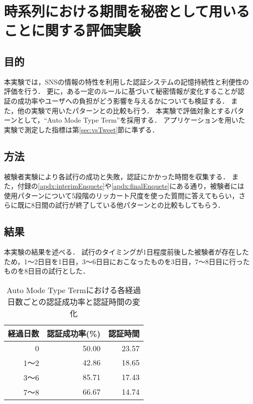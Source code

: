 \section{時系列における期間を秘密として用いることに関する評価実験}\label{sec:vsTerm}
\subsection{目的}
本実験では，SNSの情報の特性を利用した認証システムの記憶持続性と利便性の評価を行う．
更に，ある一定のルールに基づいて秘密情報が変化することが認証の成功率やユーザへの負担がどう影響を与えるかについても検証する．
また，他の実験で用いたパターンとの比較も行う．
本実験で評価対象とするパターンとして，``Auto Mode Type Term''を採用する．
アプリケーションを用いた実験で測定した指標は第\ref{sec:vsTweet}節に準ずる．

\subsection{方法}
被験者実験により各試行の成功と失敗，認証にかかった時間を収集する．
また，付録の\ref{apdx:interimEnquete}や\ref{apdx:finalEnquete}にある通り，被験者には使用パターンについて5段階のリッカート尺度を使った質問に答えてもらい，さらに既に8日間の試行が終了している他パターンとの比較もしてもらう．

\subsection{結果}
本実験の結果を述べる．
試行のタイミングが1日程度前後した被験者が存在したため，1〜2日目を1日目，3〜6日目におこなったものを3日目，7〜8日目に行ったものを8日目の試行とした．
\begin{table}[ht]
  \begin{center}
    \small
    \begin{tabular}{|r|r|r|} \hline
      経過日数 & 認証成功率(\%) & 認証時間\\ \hline
      0 & 50.00 & 23.57 \\
      1〜2 & 42.86 & 18.65 \\
      3〜6 & 85.71 & 17.43 \\
      7〜8 & 66.67 & 14.74 \\ \hline
    \end{tabular}
  \end{center}
  \caption{Auto Mode Type Termにおける各経過日数ごとの認証成功率と認証時間の変化}
  \label{tab:auto_term.data}
\end{table}

